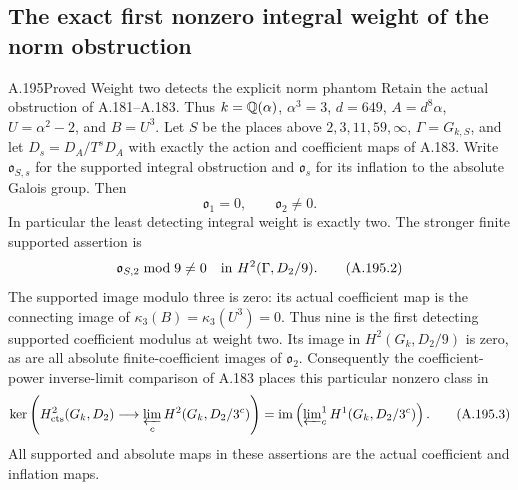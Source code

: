 \subsection{The exact first nonzero integral weight of the norm obstruction}

\begin{statement}{A.195}{Proved}
{Weight two detects the explicit norm phantom}
Retain the actual obstruction of A.181--A.183.  Thus
\(k=\mathbb Q(\alpha)\), \(\alpha^3=3\), \(d=649\),
\(A=d^8\alpha\), \(U=\alpha^2-2\), and \(B=U^3\).
Let \(S\) be the places above \(2,3,11,59,\infty\),
\(\Gamma=G_{k,S}\), and let \(D_s=D_A/T^sD_A\)
with exactly the action and coefficient maps of A.183.
Write \(\mathfrak o_{S,s}\) for the supported integral
obstruction and \(\mathfrak o_s\) for its inflation to
the absolute Galois group.  Then
\[
             \mathfrak o_1=0,\qquad \mathfrak o_2\ne0.
\tag{A.195.1}
\]
In particular the least detecting integral weight is exactly two.
The stronger finite supported assertion is
\[
 \mathfrak o_{S,2}\bmod9\ne0
       \quad\hbox{in }H^2(\Gamma,D_2/9).
\tag{A.195.2}
\]
The supported image modulo three is zero: its actual
coefficient map is the connecting image of
\(\kappa_3(B)=\kappa_3(U^3)=0\).  Thus nine is the
first detecting supported coefficient modulus at weight two.
Its image in \(H^2(G_k,D_2/9)\) is zero, as are all
absolute finite-coefficient images of \(\mathfrak o_2\).
Consequently the coefficient-power inverse-limit comparison of
A.183 places this particular nonzero class in
\[
 \ker\left(H^2_{\rm cts}(G_k,D_2)
                  \longrightarrow\varprojlim_c
                         H^2(G_k,D_2/3^c)\right)
 =\operatorname{im}\left(\varprojlim\nolimits_c^1
                      H^1(G_k,D_2/3^c)\right).
\tag{A.195.3}
\]
All supported and absolute maps in these assertions are the
actual coefficient and inflation maps.
\end{statement}


